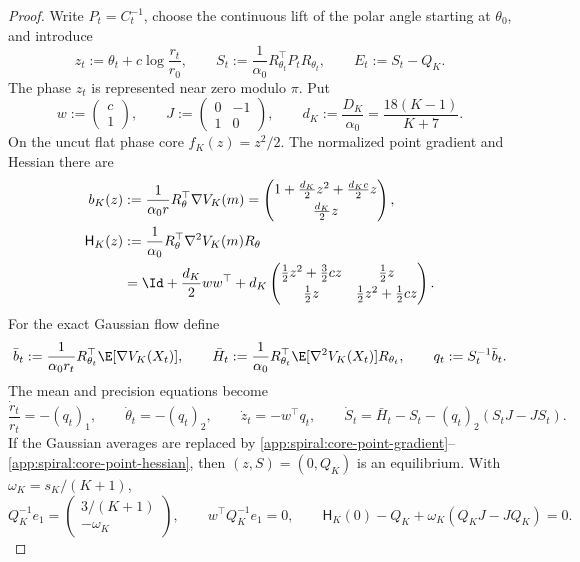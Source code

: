 \begin{proof}
Write \(P_t=C_t^{-1}\), choose the continuous lift of the polar angle
starting at \(\theta_0\), and introduce
\begin{equation}
\label{app:spiral:transverse-coordinates}
 z_t:=\theta_t+c\log\frac{r_t}{r_0},
 \qquad
 S_t:=\frac1{\alpha_0}R_{\theta_t}^{\top}P_tR_{\theta_t},
 \qquad
 E_t:=S_t-Q_K.
\end{equation}
The phase \(z_t\) is represented near zero modulo \(\pi\).  Put
\[
 w:=\begin{pmatrix}c\\1\end{pmatrix},
 \qquad
 J:=\begin{pmatrix}0&-1\\1&0\end{pmatrix},
 \qquad
 d_K:=\frac{D_K}{\alpha_0}=\frac{18(K-1)}{K+7}.
\]
On the uncut flat phase core \(f_K(z)=z^2/2\).  The normalized point
gradient and Hessian there are
\begin{align}
\label{app:spiral:core-point-gradient}
 b_K(z)
 &:=\frac1{\alpha_0 r}R_\theta^\top\nabla V_K(m)
 =\begin{pmatrix}
 1+\frac{d_K}{2}z^2+\frac{d_Kc}{2}z\\[1mm]
 \frac{d_K}{2}z
 \end{pmatrix},\\
\label{app:spiral:core-point-hessian}
 \mathsf H_K(z)
 &:=\frac1{\alpha_0}R_\theta^\top\nabla^2V_K(m)R_\theta\notag\\
 &=\Id+\frac{d_K}{2}ww^\top
 +d_K\begin{pmatrix}
 \frac12z^2+\frac32cz&\frac12z\\[1mm]
 \frac12z&\frac12z^2+\frac12cz
 \end{pmatrix}.
\end{align}
For the exact Gaussian flow define
\[
 \bar b_t:=\frac1{\alpha_0 r_t}R_{\theta_t}^\top
            \E[\nabla V_K(X_t)],
 \qquad
 \bar H_t:=\frac1{\alpha_0}R_{\theta_t}^\top
            \E[\nabla^2V_K(X_t)]R_{\theta_t},
 \qquad
 q_t:=S_t^{-1}\bar b_t.
\]
The mean and precision equations become
\begin{equation}
\label{app:spiral:rotated-system}
 \frac{\dot r_t}{r_t}=-(q_t)_1,
 \qquad
 \dot\theta_t=-(q_t)_2,
 \qquad
 \dot z_t=-w^\top q_t,
 \qquad
 \dot S_t=\bar H_t-S_t-(q_t)_2(S_tJ-JS_t).
\end{equation}
If the Gaussian averages are replaced by
\eqref{app:spiral:core-point-gradient}--%
\eqref{app:spiral:core-point-hessian}, then
\((z,S)=(0,Q_K)\) is an equilibrium.  With
\(\omega_K=s_K/(K+1)\),
\[
 Q_K^{-1}e_1
 =\begin{pmatrix}3/(K+1)\\-\omega_K\end{pmatrix},
 \qquad
 w^\top Q_K^{-1}e_1=0,
 \qquad
 \mathsf H_K(0)-Q_K
 +\omega_K(Q_KJ-JQ_K)=0.
\]


\end{proof}
